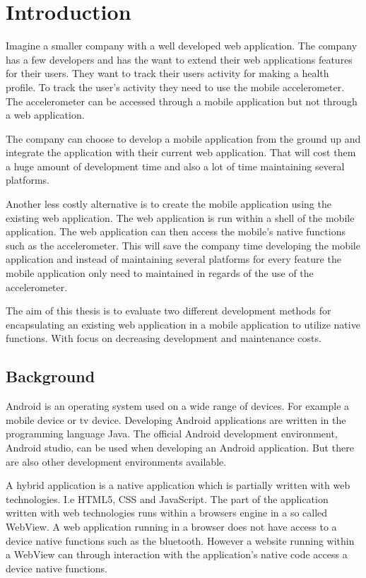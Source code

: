 \chapter{Introduction}
Imagine a smaller company with a well developed web application. The company has a few developers and has the want to extend their web applications features for their users. They want to track their users activity for making a health profile. To track the user's activity they need to use the mobile accelerometer. The accelerometer can be accessed through a mobile application but not through a web application. 

The company can choose to develop a mobile application from the ground up and integrate the application with their current web application. That will cost them a huge amount of development time and also a lot of time maintaining several platforms.

Another less costly alternative is to create the mobile application using the existing web application. The web application is run within a shell of the mobile application. The web application can then access the mobile’s native functions such as the accelerometer. This will save the company time developing the mobile application and instead of maintaining several platforms for every feature the mobile application only need to maintained in regards of the use of the accelerometer. 

The aim of this thesis is to evaluate two different development methods for encapsulating an existing web application in a mobile application to utilize native functions. With focus on decreasing development and maintenance costs.


\section{Background}
Android is an operating system used on a wide range of devices. For example a mobile device or tv device. Developing Android applications are written in the programming language Java. The official Android development environment, Android studio, can be used when developing an Android application. But there are also other development environments available. 

A hybrid application is a native application which is partially written with web technologies. I.e HTML5, CSS and JavaScript. The part of the application written with web technologies runs within a browsers engine in a so called WebView. A web application running in a browser does not have access to a device native functions such as the bluetooth. However a website running within a WebView can through interaction with the application's native code access a device native functions.

